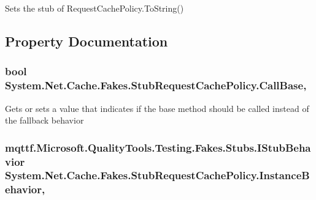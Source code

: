 Sets the stub of Request\-Cache\-Policy.\-To\-String()



\subsection{Property Documentation}
\hypertarget{class_system_1_1_net_1_1_cache_1_1_fakes_1_1_stub_request_cache_policy_acad3b59b427a363bd235a38333d11c95}{
\subsubsection[{Call\-Base}]{\setlength{\rightskip}{0pt plus 5cm}bool System.\-Net.\-Cache.\-Fakes.\-Stub\-Request\-Cache\-Policy.\-Call\-Base\hspace{0.3cm}{\ttfamily [get]}, {\ttfamily [set]}}}\label{class_system_1_1_net_1_1_cache_1_1_fakes_1_1_stub_request_cache_policy_acad3b59b427a363bd235a38333d11c95}


Gets or sets a value that indicates if the base method should be called instead of the fallback behavior

\hypertarget{class_system_1_1_net_1_1_cache_1_1_fakes_1_1_stub_request_cache_policy_a073d2ec5f365de34b274bc60d385ffe1}{
\subsubsection[{Instance\-Behavior}]{\setlength{\rightskip}{0pt plus 5cm}mqttf.\-Microsoft.\-Quality\-Tools.\-Testing.\-Fakes.\-Stubs.\-I\-Stub\-Behavior System.\-Net.\-Cache.\-Fakes.\-Stub\-Request\-Cache\-Policy.\-Instance\-Behavior\hspace{0.3cm}{\ttfamily [get]}, {\ttfamily [set]}}}\label{class_system_1_1_net_1_1_cache_1_1_fakes_1_1_stub_request_cache_policy_a073d2ec5f365de34b274bc60d385ffe1}



